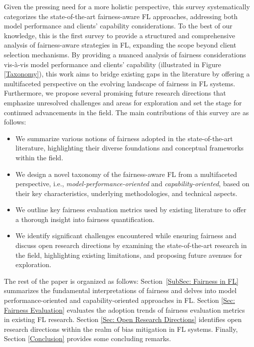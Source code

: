 \documentclass{article}
\begin{document}
Given the pressing need for a more holistic perspective, this survey systematically categorizes the state-of-the-art fairness-aware FL approaches, addressing both model performance and clients' capability considerations. To the best of our knowledge, this is the first survey to provide a structured and comprehensive analysis of fairness-aware strategies in FL, expanding the scope beyond client selection mechanisms. By providing a nuanced analysis of fairness considerations vis-\`a-vis model performance and clients' capability (illustrated in Figure \ref{Taxonomy}), this work aims to bridge existing gaps in the literature by offering a multifaceted perspective on the evolving landscape of fairness in FL systems.  Furthermore, we propose several promising future research directions that emphasize unresolved challenges and areas for exploration and set the stage for continued advancements in the field.
The main contributions of this survey are as follows:
\begin{itemize}
    \item We summarize various notions of fairness adopted in the state-of-the-art literature, highlighting their diverse foundations and conceptual frameworks within the field.
    
    \item We design a novel taxonomy of the fairness-aware FL from a multifaceted perspective, i.e., \emph{model-performance-oriented} and \emph{capability-oriented}, based on their key characteristics, underlying methodologies, and technical aspects.
    
    \item We outline key fairness evaluation metrics used by existing literature to offer a thorough insight into fairness quantification. 
    
    \item We identify significant challenges encountered while ensuring fairness and discuss open research directions by examining the state-of-the-art research in the field,
    highlighting existing limitations, and proposing future avenues for exploration.
\end{itemize}

The rest of the paper is organized as follows:
Section~\ref{SubSec: Fairness in FL} summarizes the fundamental interpretations of fairness and delves into model performance-oriented and capability-oriented approaches in FL.
Section \ref{Sec: Fairness Evaluation} evaluates the adoption trends of fairness evaluation metrics in existing FL research. 
 Section \ref{Sec: Open Research Directions} identifies
 open research directions within the realm of bias mitigation in FL systems. Finally, Section \ref{Conclusion} provides some concluding remarks.
\end{document}
